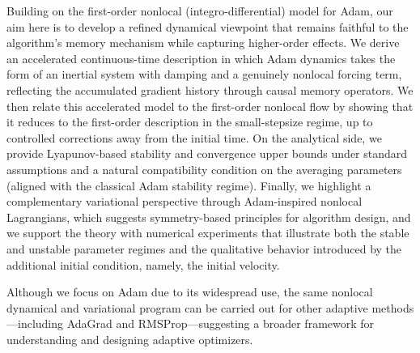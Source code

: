 \documentclass{article} %
\begin{document}
Building on the first-order nonlocal (integro-differential) model for Adam, our aim here is to develop a refined dynamical viewpoint that remains faithful to the algorithm's memory mechanism while capturing higher-order effects.  We derive an accelerated continuous-time description in which Adam dynamics takes the form of an inertial system with damping and a genuinely nonlocal forcing term, reflecting the accumulated gradient history through causal memory operators. We then relate this accelerated model to the first-order nonlocal flow by showing that it reduces to the first-order description in the small-stepsize regime, up to controlled corrections away from the initial time.  On the analytical side, we provide Lyapunov-based stability and convergence upper bounds under standard assumptions and a natural compatibility condition on the averaging parameters (aligned with the classical Adam stability regime). Finally, we highlight a complementary variational perspective through Adam-inspired nonlocal Lagrangians, which suggests symmetry-based principles for algorithm design, and we support the theory with numerical experiments that illustrate both the stable and unstable parameter regimes and the qualitative behavior introduced by the additional initial condition, namely, the initial velocity.

Although we focus on Adam due to its widespread use, the same nonlocal dynamical and variational program can be carried out for other adaptive methods---including AdaGrad and RMSProp---suggesting a broader framework for understanding and designing adaptive optimizers.
\end{document}
